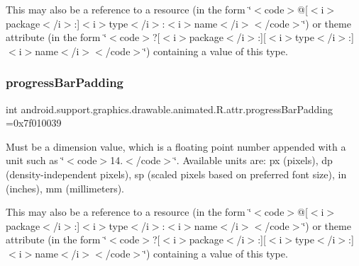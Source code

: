 This may also be a reference to a resource (in the form \char`\"{}$<$code$>$@\mbox{[}$<$i$>$package$<$/i$>$\+:\mbox{]}$<$i$>$type$<$/i$>$\+:$<$i$>$name$<$/i$>$$<$/code$>$\char`\"{}) or theme attribute (in the form \char`\"{}$<$code$>$?\mbox{[}$<$i$>$package$<$/i$>$\+:\mbox{]}\mbox{[}$<$i$>$type$<$/i$>$\+:\mbox{]}$<$i$>$name$<$/i$>$$<$/code$>$\char`\"{}) containing a value of this type. \mbox{\label{classandroid_1_1support_1_1graphics_1_1drawable_1_1animated_1_1R_1_1attr_a8f92a1516913e804d40386858e248a11}} 
\subsubsection{\texorpdfstring{progress\+Bar\+Padding}{progressBarPadding}}
{\footnotesize\ttfamily int android.\+support.\+graphics.\+drawable.\+animated.\+R.\+attr.\+progress\+Bar\+Padding =0x7f010039\hspace{0.3cm}{\ttfamily [static]}}

Must be a dimension value, which is a floating point number appended with a unit such as \char`\"{}$<$code$>$14.\+5sp$<$/code$>$\char`\"{}. Available units are\+: px (pixels), dp (density-\/independent pixels), sp (scaled pixels based on preferred font size), in (inches), mm (millimeters). 

This may also be a reference to a resource (in the form \char`\"{}$<$code$>$@\mbox{[}$<$i$>$package$<$/i$>$\+:\mbox{]}$<$i$>$type$<$/i$>$\+:$<$i$>$name$<$/i$>$$<$/code$>$\char`\"{}) or theme attribute (in the form \char`\"{}$<$code$>$?\mbox{[}$<$i$>$package$<$/i$>$\+:\mbox{]}\mbox{[}$<$i$>$type$<$/i$>$\+:\mbox{]}$<$i$>$name$<$/i$>$$<$/code$>$\char`\"{}) containing a value of this type. \mbox{\label{classandroid_1_1support_1_1graphics_1_1drawable_1_1animated_1_1R_1_1attr_aab0f409b24c8668e3fbe6e1fc3211c29}} 
